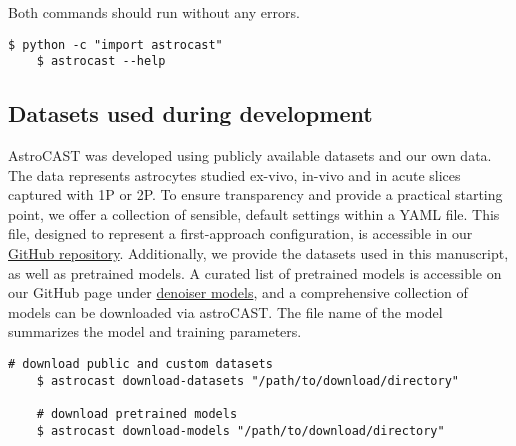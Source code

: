 Both commands should run without any errors.

\begin{lstlisting}[style=bashStyle]
    $ python -c "import astrocast"
    $ astrocast --help
\end{lstlisting}

\subsection{Datasets used during development}
\label{ref:dataset-availability}

AstroCAST was developed using publicly available datasets and our own data. The data represents astrocytes studied ex-vivo, in-vivo and in acute slices captured with \ac{1P} or \ac{2P}. To ensure transparency and provide a practical starting point, we offer a collection of sensible, default settings within a YAML file. This file, designed to represent a first-approach configuration, is accessible in our \href{https://github.com/janreising/astroCAST}{GitHub repository}. Additionally, we provide the datasets used in this manuscript, as well as pretrained models. A curated list of pretrained models is accessible on our GitHub page under \href{https://github.com/janreising/astroCAST/tree/main/denoiser_models}{denoiser models}, and a comprehensive collection of models can be downloaded via astroCAST. The file name of the model summarizes the model and training parameters.

\begin{lstlisting}[style=bashStyle]
    # download public and custom datasets
    $ astrocast download-datasets "/path/to/download/directory"

    # download pretrained models
    $ astrocast download-models "/path/to/download/directory"
\end{lstlisting}